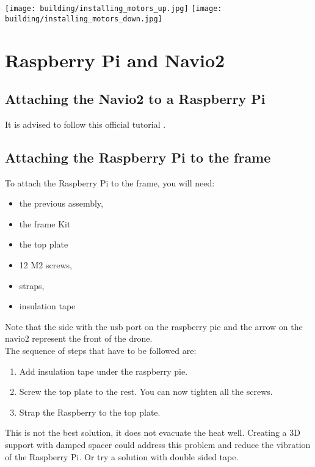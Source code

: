         \texttt{[image: building/installing\_motors\_up.jpg]}
        \texttt{[image: building/installing\_motors\_down.jpg]}
        
    \section{Raspberry Pi and Navio2}
        \subsection{Attaching the Navio2 to a Raspberry Pi}
            It is advised to follow this official tutorial \cite{emlid_hardware_setup}.
    
        \subsection{Attaching the Raspberry Pi to the frame}
        To attach the Raspberry Pi to the frame, you will need:
        \begin{itemize}
            \item the previous assembly,
            \item the frame Kit
            \item the top plate
            \item 12 M2 screws,
            \item straps,
            \item insulation tape
        \end{itemize}
        Note that the side with the usb port on the raspberry pie and the arrow on the navio2 represent the front of the drone.\\
        The sequence of steps that have to be followed are:
        \begin{enumerate}
            \item Add insulation tape under the raspberry pie.
            \item Screw the top plate to the rest. You can now tighten all the screws.
            \item Strap the Raspberry to the top plate.
        \end{enumerate}
        
        This is not the best solution, it does not evacuate the heat well. Creating a 3D support with damped spacer could address this problem and reduce the vibration of the Raspberry Pi. Or try a solution with double sided tape.
        
